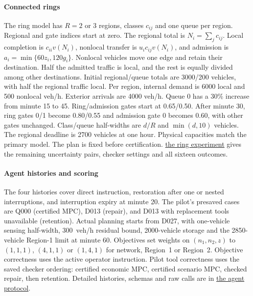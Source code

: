 \documentclass[preprint,12pt]{elsarticle}
\newcommand{\reproductiondetails}[1]{\href{https://github.com/AlienEslami/agentic-perimeter-runtime-certification/blob/main/paper/supporting_materials/REPRODUCING_THE_REDUCED_PAPER.md}{#1}}
\begin{document}
\paragraph{Connected rings}
\label{app:network-transfer}
The ring model has $R=2$ or $3$ regions, classes $c_{ij}$ and one
queue per region. Regional and gate indices start at zero. The regional
total is $N_i=\sum_jc_{ij}$. Local completion is $c_{ii}v(N_i)$, nonlocal
transfer is $u_i c_{ij}v(N_i)$, and admission is $a_i=\min\{60z_i,120g_i\}$. Nonlocal
vehicles move one edge and retain their destination. Half the admitted
traffic is local, and the rest is equally divided among other destinations.
Initial regional/queue totals are 3000/200 vehicles, with half the regional
traffic local. Per region, internal demand is 6000 local and 500 nonlocal
veh/h. Exterior arrivals are 4000 veh/h. Queue 0 has a 30\%
increase from minute 15 to 45. Ring/admission gates start at 0.65/0.50.
After minute 30, ring gates 0/1 become 0.80/0.55 and admission gate 0
becomes 0.60, with other gates unchanged. Class/queue half-widths are
$d/R$ and $\min(d,10)$ vehicles. The regional deadline is 2700 vehicles
at one hour. Physical capacities match the primary model. The plan is
fixed before certification. \reproductiondetails{the ring experiment}
gives the remaining uncertainty pairs, checker settings and all sixteen
outcomes.

\paragraph{Agent histories and scoring}
\label{sec:supp-execution}
The four histories cover direct instruction, restoration after one or
nested interruptions, and interruption expiry at minute 20. The pilot's
presaved cases are Q000 (certified MPC), D013 (repair), and D013 with
replacement tools unavailable (retention). Actual planning starts from
D027, with one-vehicle sensing half-width, 300~veh/h residual bound,
2000-vehicle storage and the 2850-vehicle Region-1 limit at minute 60.
Objectives set weights on $(n_1,n_2,z)$ to $(1,1,1)$, $(4,1,1)$ or
$(1,4,1)$ for network, Region~1 or Region~2. Objective correctness uses
the active operator instruction. Pilot tool correctness uses the saved
checker ordering: certified economic MPC, certified scenario MPC,
checked repair, then retention. Detailed histories, schemas and raw
calls are in \reproductiondetails{the agent protocol}.


\setlength{\bibsep}{0pt}

\end{document}
